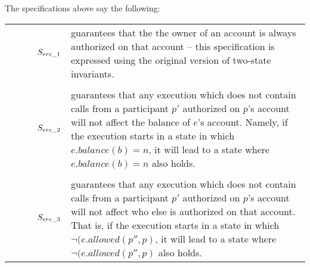 The specifications above say the following:
\\
\begin{tabular}{ll}
\begin{minipage}{.10\textwidth}
$\strut \ \ \ \ \ \ \ \ \ \   S_{erc\_1}$
\end{minipage}
&
\begin{minipage}{.85\textwidth}
guarantees that the the owner of an account is always authorized on that account -- this specification is expressed using the original version of two-state invariants.
\end{minipage}
\\
\\
\begin{minipage}{.10\textwidth}
$\strut \ \ \ \ \ \ \ \ \ \   S_{erc\_2}$ 
\end{minipage}
&
\begin{minipage}{.85\textwidth}
guarantees that any execution which does not contain calls from a participant $p'$ authorized on $p$'s account will not affect the balance of $e$'s account. Namely, if the execution starts in a state in which $ e.balance(b)=n$, it will lead to a state where $ e.balance(b)=n$ also holds.
\end{minipage}
\\
\\
\begin{minipage}{.10\textwidth}
$\strut \ \ \ \ \ \ \ \ \ \   S_{erc\_3}$ 
\end{minipage}
&
\begin{minipage}{.85\textwidth}
guarantees that any execution which does not contain calls from a participant $p'$ authorized on $p$'s account will not affect who else is authorized on that account. That is, if the execution starts in a state in which $ \neg (e.allowed(p'',p)$, it will lead to a state where $ \neg (e.allowed(p'',p)$ also holds.
\end{minipage}
\end{tabular}


